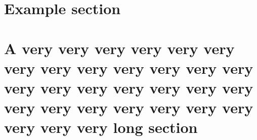 \documentclass{scrartcl}
\begin{document}
        \section{Example section}
        \lipsum[1]

        \section*{A very very very very very very very very very very very very very very very very very very very very very very very very very very very very very very long section}
        \lipsum[1]
\end{document}
